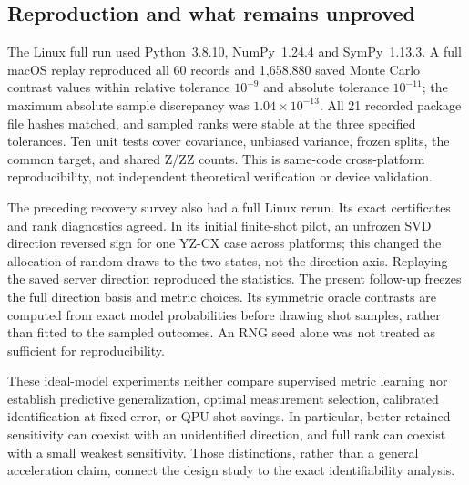 \subsection{Reproduction and what remains unproved}
The Linux full run used Python~3.8.10, NumPy~1.24.4 and
SymPy~1.13.3. A full macOS replay reproduced all 60 records and
1,658,880 saved Monte Carlo contrast values within relative tolerance
$10^{-9}$ and absolute tolerance $10^{-11}$; the maximum absolute
sample discrepancy was $1.04\times10^{-13}$. All 21 recorded package
file hashes matched, and sampled ranks were stable at the three
specified tolerances. Ten unit tests cover covariance, unbiased
variance, frozen splits, the common target, and shared Z/ZZ counts.
This is same-code cross-platform reproducibility, not independent
theoretical verification or device validation.

The preceding recovery survey also had a full Linux rerun. Its
exact certificates and rank diagnostics agreed. In its initial
finite-shot pilot, an unfrozen SVD direction reversed sign for one
YZ-CX case across platforms; this changed the allocation of random
draws to the two states, not the direction axis. Replaying the saved
server direction reproduced the statistics. The present follow-up
freezes the full direction basis and metric choices. Its symmetric
oracle contrasts are computed from exact model probabilities before
drawing shot samples, rather than fitted to the sampled outcomes.
An RNG seed alone was not treated as sufficient for reproducibility.

These ideal-model experiments neither compare supervised metric
learning nor establish predictive generalization, optimal measurement
selection, calibrated identification at fixed error, or QPU shot
savings. In particular, better retained sensitivity can coexist with
an unidentified direction, and full rank can coexist with a small
weakest sensitivity. Those distinctions, rather than a general
acceleration claim, connect the design study to the exact
identifiability analysis.
